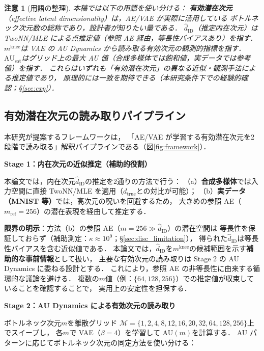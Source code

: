 \documentclass[11pt,a4paper]{jsarticle}
\newtheorem{remark}{注意}
\newcommand{\dtrue}{d_{\mathrm{true}}}
\newcommand{\kap}{\kappa}
\newcommand{\AUsat}{\mathrm{AU}_{\mathrm{sat}}}
\newcommand{\mknee}{m^{\mathrm{knee}}}
\begin{document}
\begin{remark}[用語の整理]
本稿では以下の用語を使い分ける：
\textbf{有効潜在次元}（effective latent dimensionality）は，AE/VAE が実際に活用している
ボトルネック次元数の総称であり，設計者が知りたい量である．
\textbf{$\hat{d}_\mathrm{ID}$}（推定内在次元）は TwoNN/MLE による点推定値（参照 AE 経由，等長性バイアスあり）を指す．
\textbf{$\mknee$}は VAE の AU Dynamics から読み取る有効次元の観測的指標を指す．
\textbf{$\AUsat$}はグリッド上の最大 AU 値（合成多様体では飽和値，実データでは参考値）を指す．
これらはいずれも「有効潜在次元」の異なる近似・観測手法による推定値であり，
原理的には一致を期待できる（本研究条件下での経験的確認；§\ref{sec:exp}）．
\end{remark}

\subsection{有効潜在次元の読み取りパイプライン}\label{sec:framework_pipeline}

本研究が提案するフレームワークは，
「AE/VAE が学習する有効潜在次元を2段階で読み取る」解釈パイプラインである（図\ref{fig:framework}）．

\textbf{Stage 1：内在次元の近似推定（補助的役割）}

本論文では，内在次元$\hat{d}_\mathrm{ID}$の推定を2通りの方法で行う：
（a）\textbf{合成多様体}では入力空間に直接 TwoNN/MLE を適用（$\dtrue$との対比が可能）；
（b）\textbf{実データ（MNIST 等）}では，高次元の呪いを回避するため，
大きめの参照 AE（$m_{\mathrm{ref}} = 256$）の潜在表現を経由して推定する．

\textbf{限界の明示}：方法（b）の参照 AE（$m = 256 \gg \hat{d}_\mathrm{ID}$）の潜在空間は
等長性を保証しておらず（補助測定：$\kap \approx 10^9$；§\ref{sec:disc_limitation}），
得られた$\hat{d}_\mathrm{ID}$は等長性バイアスを含む近似値である．
本論文では，$\hat{d}_\mathrm{ID}$を$\mknee$の候補範囲を示す\textbf{補助的な事前情報}として扱い，
主要な有効次元の読み取りは Stage 2 の AU Dynamics に委ねる設計とする．
これにより，参照 AE の非等長性に由来する循環的な議論を避ける．
複数の$m$値（例：$\{64, 128, 256\}$）での推定値が収束していることを確認することで，
実用上の安定性を担保する．

\textbf{Stage 2：AU Dynamics による有効次元の読み取り}

ボトルネック次元$m$を離散グリッド
$\mathcal{M} = \{1, 2, 4, 8, 12, 16, 20, 32, 64, 128, 256\}$上でスイープし，
各$m$で VAE（$\beta = 4$）を学習して AU$(m)$を計算する．
AU パターンに応じてボトルネック次元の同定方法を使い分ける：
\end{document}
